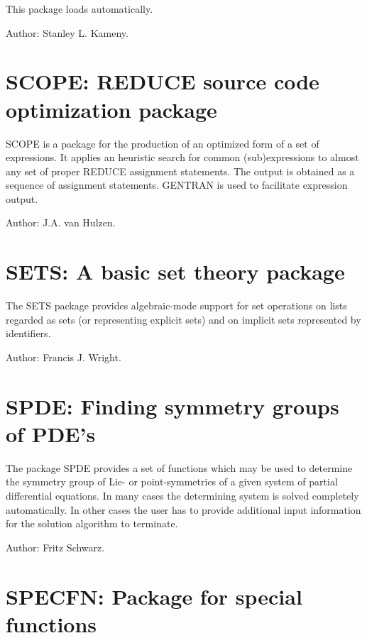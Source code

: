 This package loads automatically.

Author: Stanley L. Kameny.

\section{SCOPE: REDUCE source code optimization package} 

SCOPE is a package for the production of an optimized form of a set of
expressions.  It applies an heuristic search for common (sub)expressions
to almost any set of proper REDUCE assignment statements.  The
output is obtained as a sequence of assignment statements.  GENTRAN is
used to facilitate expression output.

Author:  J.A. van Hulzen.

\section{SETS: A basic set theory package} 

The SETS package provides algebraic-mode support for set operations on
lists regarded as sets (or representing explicit sets) and on implicit
sets represented by identifiers.

Author: Francis J. Wright.

\section{SPDE: Finding symmetry groups of {PDE}'s}

The package SPDE provides a set of functions which may be used to
determine the symmetry group of Lie- or point-symmetries of a given system
of partial differential equations. In many cases the determining system is
solved completely automatically. In other cases the user has to provide
additional input information for the solution algorithm to terminate.

Author: Fritz Schwarz.

\section{SPECFN: Package for special functions} 


